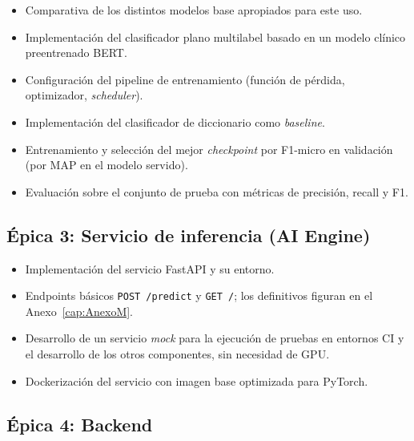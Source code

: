 \begin{itemize}[noitemsep]
 \item Comparativa de los distintos modelos base apropiados para este uso.
 \item Implementación del clasificador plano multilabel basado en un modelo clínico preentrenado BERT.
 \item Configuración del pipeline de entrenamiento (función de pérdida, optimizador, \emph{scheduler}).
 \item Implementación del clasificador de diccionario como \emph{baseline}.
 \item Entrenamiento y selección del mejor \emph{checkpoint} por F1-micro en validación (por MAP en el modelo servido).
 \item Evaluación sobre el conjunto de prueba con métricas de precisión, recall y F1.
\end{itemize}

\subsection{Épica 3: Servicio de inferencia (AI Engine)}

\begin{itemize}[noitemsep]
 \item Implementación del servicio FastAPI y su entorno.
 \item Endpoints básicos \texttt{POST /predict} y \texttt{GET /}; los definitivos figuran en el Anexo~\ref{cap:AnexoM}.
 \item Desarrollo de un servicio \emph{mock} para la ejecución de pruebas en entornos CI y el desarrollo de los otros componentes, sin necesidad de GPU.
 \item Dockerización del servicio con imagen base optimizada para PyTorch.
\end{itemize}

\subsection{Épica 4: Backend}

